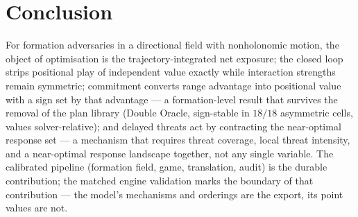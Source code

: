 \documentclass[12pt,a4paper]{article}
\begin{document}
\section{Conclusion}
For formation adversaries in a directional field with nonholonomic
motion, the object of optimisation is the trajectory-integrated net
exposure; the closed loop strips positional play of independent value
exactly while interaction strengths remain symmetric; commitment converts
range advantage into positional value with a sign set by that advantage
--- a formation-level result that survives the removal of the plan
library (Double Oracle, sign-stable in $18/18$ asymmetric cells, values
solver-relative); and
delayed threats act by contracting the near-optimal response set ---
a mechanism that requires threat coverage, local threat intensity, and a
near-optimal response landscape together, not any single variable.  The calibrated
pipeline (formation field, game, translation, audit) is the durable
contribution; the matched engine validation marks the boundary of that
contribution --- the model's mechanisms and orderings are the export, its
point values are not.
\end{document}
